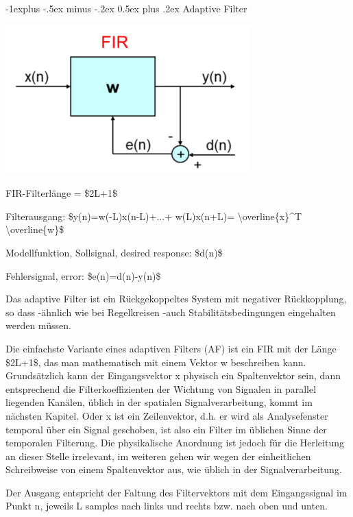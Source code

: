 \documentclass[a4paper]{article}
\makeatletter
\renewcommand{\subsection}{\@startsection{subsection}{2}{0mm}%
 {-1explus -.5ex minus -.2ex}%
 {0.5ex plus .2ex}%
 {\normalfont\normalsize\bfseries}}
\makeatother
\begin{document}
\begin{multicols}{3}
  \subsection{Adaptive Filter}\label{adaptive-filter}

  \begin{itemize*}
    \item \includegraphics[width=.5\linewidth]{Assets/Biosignalverarbeitung-adaptiv-fir.png}
    \begin{itemize*}
      \item FIR-Filterlänge = \$2L+1\$
      \item Filterausgang: \$y(n)=w(-L)x(n-L)+...+ w(L)x(n+L)= \textbackslash overline\{x\}\^{}T \textbackslash overline\{w\}\$
      \item Modellfunktion, Sollsignal, desired response: \$d(n)\$
      \item Fehlersignal, error: \$e(n)=d(n)-y(n)\$
    \end{itemize*}
    \item Das adaptive Filter ist ein Rückgekoppeltes System mit negativer Rückkopplung, so dass -ähnlich wie bei Regelkreisen -auch Stabilitätsbedingungen eingehalten werden müssen.
    \item Die einfachste Variante eines adaptiven Filters (AF) ist ein FIR mit der Länge \$2L+1\$, das man mathematisch mit einem Vektor w beschreiben kann. Grundsätzlich kann der Eingangsvektor x physisch ein Spaltenvektor sein, dann entsprechend die Filterkoeffizienten der Wichtung von Signalen in parallel liegenden Kanälen, üblich in der spatialen Signalverarbeitung, kommt im nächsten Kapitel. Oder x ist ein Zeilenvektor, d.h. er wird als Analysefenster temporal über ein Signal geschoben, ist also ein Filter im üblichen Sinne der temporalen Filterung. Die physikalische Anordnung ist jedoch für die Herleitung an dieser Stelle irrelevant, im weiteren gehen wir wegen der einheitlichen Schreibweise von einem Spaltenvektor aus, wie üblich in der Signalverarbeitung.
    \item Der Ausgang entspricht der Faltung des Filtervektors mit dem Eingangssignal im Punkt n, jeweils L samples nach links und rechts bzw. nach oben und unten.

\end{itemize*}
\end{multicols}
\end{document}
